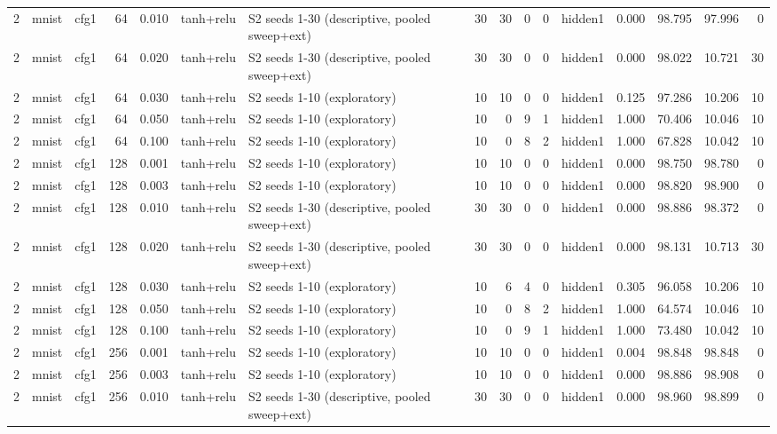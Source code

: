 \begin{table}[htbp]
{\begin{tabular}{@{}rllrrllrrrrlrrrr@{}}
2 & mnist & cfg1 & 64 & 0.010 & tanh+relu & S2 seeds 1-30 (descriptive, pooled sweep+ext) & 30 & 30 & 0 & 0 & hidden1 & 0.000 & 98.795 & 97.996 & 0 \\
2 & mnist & cfg1 & 64 & 0.020 & tanh+relu & S2 seeds 1-30 (descriptive, pooled sweep+ext) & 30 & 30 & 0 & 0 & hidden1 & 0.000 & 98.022 & 10.721 & 30 \\
2 & mnist & cfg1 & 64 & 0.030 & tanh+relu & S2 seeds 1-10 (exploratory) & 10 & 10 & 0 & 0 & hidden1 & 0.125 & 97.286 & 10.206 & 10 \\
2 & mnist & cfg1 & 64 & 0.050 & tanh+relu & S2 seeds 1-10 (exploratory) & 10 & 0 & 9 & 1 & hidden1 & 1.000 & 70.406 & 10.046 & 10 \\
2 & mnist & cfg1 & 64 & 0.100 & tanh+relu & S2 seeds 1-10 (exploratory) & 10 & 0 & 8 & 2 & hidden1 & 1.000 & 67.828 & 10.042 & 10 \\
2 & mnist & cfg1 & 128 & 0.001 & tanh+relu & S2 seeds 1-10 (exploratory) & 10 & 10 & 0 & 0 & hidden1 & 0.000 & 98.750 & 98.780 & 0 \\
2 & mnist & cfg1 & 128 & 0.003 & tanh+relu & S2 seeds 1-10 (exploratory) & 10 & 10 & 0 & 0 & hidden1 & 0.000 & 98.820 & 98.900 & 0 \\
2 & mnist & cfg1 & 128 & 0.010 & tanh+relu & S2 seeds 1-30 (descriptive, pooled sweep+ext) & 30 & 30 & 0 & 0 & hidden1 & 0.000 & 98.886 & 98.372 & 0 \\
2 & mnist & cfg1 & 128 & 0.020 & tanh+relu & S2 seeds 1-30 (descriptive, pooled sweep+ext) & 30 & 30 & 0 & 0 & hidden1 & 0.000 & 98.131 & 10.713 & 30 \\
2 & mnist & cfg1 & 128 & 0.030 & tanh+relu & S2 seeds 1-10 (exploratory) & 10 & 6 & 4 & 0 & hidden1 & 0.305 & 96.058 & 10.206 & 10 \\
2 & mnist & cfg1 & 128 & 0.050 & tanh+relu & S2 seeds 1-10 (exploratory) & 10 & 0 & 8 & 2 & hidden1 & 1.000 & 64.574 & 10.046 & 10 \\
2 & mnist & cfg1 & 128 & 0.100 & tanh+relu & S2 seeds 1-10 (exploratory) & 10 & 0 & 9 & 1 & hidden1 & 1.000 & 73.480 & 10.042 & 10 \\
2 & mnist & cfg1 & 256 & 0.001 & tanh+relu & S2 seeds 1-10 (exploratory) & 10 & 10 & 0 & 0 & hidden1 & 0.004 & 98.848 & 98.848 & 0 \\
2 & mnist & cfg1 & 256 & 0.003 & tanh+relu & S2 seeds 1-10 (exploratory) & 10 & 10 & 0 & 0 & hidden1 & 0.000 & 98.886 & 98.908 & 0 \\
2 & mnist & cfg1 & 256 & 0.010 & tanh+relu & S2 seeds 1-30 (descriptive, pooled sweep+ext) & 30 & 30 & 0 & 0 & hidden1 & 0.000 & 98.960 & 98.899 & 0 \\

\end{tabular}}
\end{table}
